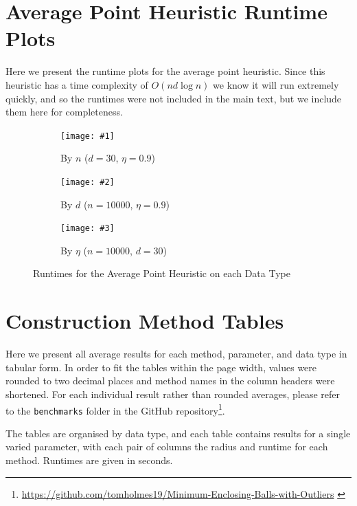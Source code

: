 \documentclass[11pt,twoside]{report}
\newcommand{\benchmarkfigure}[5]{
    \begin{figure}[ht]
        \centering
        \begin{subfigure}[b]{0.475\textwidth}
            \centering
            \texttt{[image: \#1]}
            \caption{By $n$ ($d=30$, $\eta=0.9$)}
            \label{#5_n}
        \end{subfigure}
        \hfill
        \begin{subfigure}[b]{0.475\textwidth}
            \centering
            \texttt{[image: \#2]}
            \caption{By $d$ ($n=10000$, $\eta=0.9$)}
            \label{#5_d}
        \end{subfigure}
        
        \begin{subfigure}[b]{0.475\textwidth}
            \centering
            \texttt{[image: \#3]}
            \caption{By $\eta$ ($n=10000$, $d=30$)}
            \label{#5_eta}
        \end{subfigure}
        \caption{#4}
        \label{#5}
    \end{figure}
}
\newcommand{\benchmarkfigurebyfunc}[3]{
    \benchmarkfigure{alg_benchmarks/by_func/#1_func_n_d30_eta0p9.png}{alg_benchmarks/by_func/#1_func_d_n10000_eta0p9.png}{alg_benchmarks/by_func/#1_func_eta_n10000_d30.png}{#2}{#3}
}
\theoremstyle{definition}
\numberwithin{theorem}{section}
\numberwithin{definition}{section}
\numberwithin{lemma}{section}
\numberwithin{proposition}{section}
\numberwithin{equation}{section}
\numberwithin{figure}{section}
\begin{document}
\begin{appendices}
    \section{Average Point Heuristic Runtime Plots}\label{app:aph_runtime}
    Here we present the runtime plots for the average point heuristic. Since this heuristic has a time complexity of $O(nd\log n)$ we know it will run extremely quickly, and so the runtimes were not included in the main text, but we include them here for completeness.
    
    \benchmarkfigurebyfunc{shrink_avg}{Runtimes for the Average Point Heuristic on each Data Type}{fig:aph_benchmarks}
    
    \clearpage
    
    \section{Construction Method Tables}\label{app:constr_tables}
    Here we present all average results for each method, parameter, and data type in tabular form. In order to fit the tables within the page width, values were rounded to two decimal places and method names in the column headers were shortened. For each individual result rather than rounded averages, please refer to the \texttt{benchmarks} folder in the GitHub repository\footnote{\url{https://github.com/tomholmes19/Minimum-Enclosing-Balls-with-Outliers} \cite{Holmes_Minimum_Enclosing_Balls_2021}}.
    
    The tables are organised by data type, and each table contains results for a single varied parameter, with each pair of columns the radius and runtime for each method. Runtimes are given in seconds.
    

\end{appendices}
\end{document}
